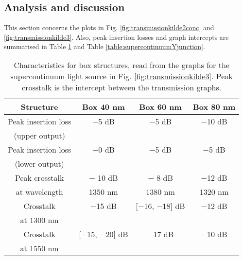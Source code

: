 \subsection{Analysis and discussion}
This section concerns the plots in Fig. \ref{fig:transmissionkilde2conc} and \ref{fig:transmissionkilde3}. Also, peak insertion losses and graph intercepts are summarised in Table  \ref{table:supercontinuumBox} and Table  \ref{table:supercontinuumYjunction}.

\begin{table}[h]
\centering
    \begin{tabular}{|c|c|c|c|}
    \hline
    \textbf{Structure}      & \textbf{Box 40 nm} & \textbf{Box 60 nm} & \textbf{Box 80 nm} \\ \hline
    Peak insertion loss & $-$5 dB      & $-$5 dB      & $-$10 dB      \\
    (upper output) & ~         & ~         & ~         \\ \hline
    Peak insertion loss & $-$0 dB   & $-$5 dB      & $-$5 dB     \\
    (lower output) & ~         & ~         & ~         \\ \hline
    Peak crosstalk & $-$ 10 dB         & $-$ 8 dB       & $-$12 dB          \\  
    at wavelength      & 1350 nm   & 1380 nm   & 1320 nm     \\ \hline
    Crosstalk       & $-$15 dB  & [$-$16, $-$18] dB        & $-$12 dB          \\  
    at 1300 nm      & ~         & ~         & ~          \\  \hline
    Crosstalk       & [$-$15, $-$20] dB         & $-$17 dB         & $-$10 dB          \\  
    at 1550 nm      & ~         & ~         & ~          \\  \hline
    \end{tabular}
    \caption{Characteristics for box structures, read from the graphs for the supercontinuum light source in Fig. \ref{fig:transmissionkilde3}. Peak crosstalk is the intercept between the transmission graphs.}
    \label{table:supercontinuumBox}
\end{table}

